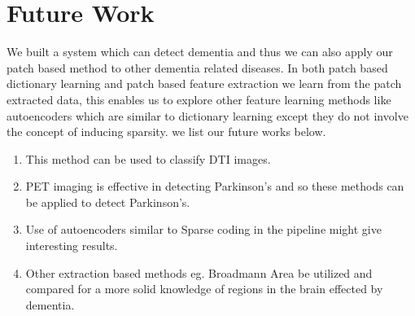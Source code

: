 \chapter{Future Work}

We built a system which can detect dementia and thus we can also apply our patch based method to other dementia related diseases. In both patch based dictionary learning and patch based feature extraction we learn from the patch extracted data, this enables us to explore other feature learning methods like autoencoders which are similar to dictionary learning except they do not involve the concept of inducing sparsity. we list our future works below. 
\begin{enumerate}
	\item This method can be used to classify DTI images.
	\item PET imaging is effective in detecting Parkinson's and so 
	these methods can be applied to detect Parkinson's.
	\item Use of autoencoders similar to Sparse coding in the pipeline might give interesting results.
	\item Other extraction based methods eg. Broadmann Area be utilized and compared for a more solid knowledge of regions in the brain effected by dementia. 
\end{enumerate}